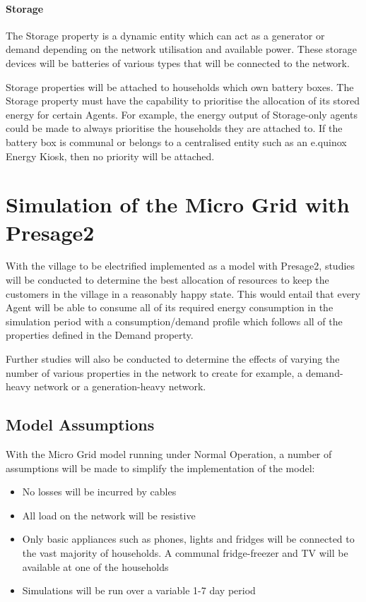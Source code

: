 \paragraph{Storage}
The Storage property is a dynamic entity which can act as a generator or demand depending on the network utilisation and available power. These storage devices will be batteries of various types that will be connected to the network.

Storage properties will be attached to households which own battery boxes. The Storage property must have the capability to prioritise the allocation of its stored energy for certain Agents. For example, the energy output of Storage-only agents could be made to always prioritise the households they are attached to. If the battery box is communal or belongs to a centralised entity such as an e.quinox Energy Kiosk, then no priority will be attached.

\section{Simulation of the Micro Grid with Presage2}
With the village to be electrified implemented as a model with Presage2, studies will be conducted to determine the best allocation of resources to keep the customers in the village in a reasonably happy state. This would entail that every Agent will be able to consume all of its required energy consumption in the simulation period with a consumption/demand profile which follows all of the properties defined in the Demand property.

Further studies will also be conducted to determine the effects of varying the number of various properties in the network to create for example, a demand-heavy network or a generation-heavy network.  

\subsection{Model Assumptions}
With the Micro Grid model running under Normal Operation, a number of assumptions will be made to simplify the implementation of the model:
\begin{itemize}
\item No losses will be incurred by cables
\item All load on the network will be resistive
\item Only basic appliances such as phones, lights and fridges will be connected to the vast majority of households. A communal fridge-freezer and TV will be available at one of the households
\item Simulations will be run over a variable 1-7 day period
\end{itemize}


